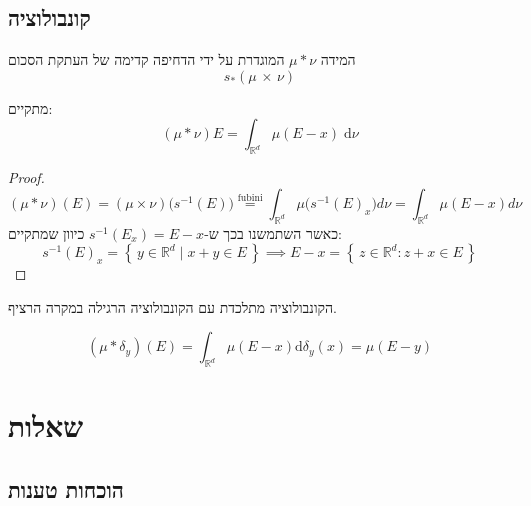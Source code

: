 \documentclass{tstextbook}
\begin{document}
\section{קונבולוציה}

\begin{definition}[קונבולוציה]
המידה \(\mu*\nu\) המוגדרת על ידי הדחיפה קדימה של העתקת הסכום
$$ s_{\ast}\left(\mu\,\times\,\nu\right)$$

\end{definition}
\begin{proposition}
מתקיים:
$$\left( \mu*\nu \right)E=\int _{\mathbb{R}^{d}}\mu(E-x) \;\mathrm{d} \nu $$

\end{proposition}
\begin{proof}
$$(\mu*\nu)(E)=(\mu\times\nu)\bigl(s^{-1}(E)\bigr)\stackrel{\text{fubini}}{=}\int_{\mathbb{R}^{d}}\mu\bigl(s^{-1}(E)_{x}\bigr)d\nu=\int_{\mathbb{R}^{d}}\mu(E-x)d\nu$$
כאשר השתמשנו בכך ש-\(s ^{-1}(E_{x})=E-x\) כיוון שמתקיים:
$$s^{-1}(E)_{x}=\left\{ \,y\in\mathbb{R}^{d}\mid x+y\in E\, \right\}\implies E-x=\left\{ \,z\in\mathbb{R}^{d}:z+x\in E\, \right\}$$

\end{proof}
\begin{remark}
הקונבולוציה מתלכדת עם הקונבולוציה הרגילה במקרה הרציף.

\end{remark}
\begin{proposition}
$$\left( \mu*\delta_{y} \right)(E)=\int_{\mathbb{R}^{d}}\mu(E-x)\mathrm{d}\delta_{y}(x)=\mu(E-y)$$

\end{proposition}
\chapter{שאלות}

\section{הוכחות טענות}
\end{document}
